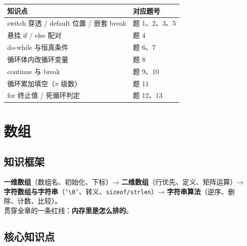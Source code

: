 \documentclass[UTF8,zihao=-4,a4paper]{ctexart}
\begin{document}
\begin{tipbox}[自测指路 · 第 3 章]
\begin{tabularx}{\linewidth}{p{5.2cm} X}
\toprule
知识点 & 对应题号\\
\midrule
switch 穿透 / default 位置 / 嵌套 break & 题 1、2、3、5\\
悬挂 if / else 配对 & 题 4\\
do-while 与恒真条件 & 题 6、7\\
循环体内改循环变量 & 题 8\\
continue 与 break & 题 9、10\\
循环累加填空（$\pi$ 级数） & 题 11\\
for 终止值 / 死循环判定 & 题 12、13\\
\bottomrule
\end{tabularx}
\end{tipbox}


\section{数组}

\subsection{知识框架}

\begin{keybox}[本章脉络]
\textbf{一维数组}（数组名、初始化、下标）→ \textbf{二维数组}（行优先、定义、矩阵运算）→ \textbf{字符数组与字符串}（\texttt{'\textbackslash 0'}、转义、\texttt{sizeof/strlen}）→ \textbf{字符串算法}（逆序、删除、计数、比较）。\\
贯穿全章的一条红线：\textbf{内存里是怎么排的}。
\end{keybox}

\subsection{核心知识点}
\end{document}
